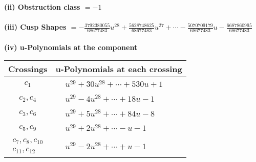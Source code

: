 \documentclass[1p]{elsarticle_modified}
\theoremstyle{definition}
\begin{document}
\flushleft \textbf{(ii) Obstruction class $= -1$}\\~\\
\flushleft \textbf{(iii) Cusp Shapes $= -\frac{3792380055}{68677483} u^{28}+\frac{5628748625}{68677483} u^{27}+\cdots-\frac{5070709179}{68677483} u-\frac{6687860995}{68677483}$}\\~\\
\newpage\renewcommand{\arraystretch}{1}
\flushleft \textbf{(iv) u-Polynomials at the component}\newline \\
\begin{tabular}{m{50pt}|m{274pt}}
Crossings & \hspace{64pt}u-Polynomials at each crossing \\
\hline $$\begin{aligned}c_{1}\end{aligned}$$&$\begin{aligned}
&u^{29}+30 u^{28}+\cdots+530 u+1
\end{aligned}$\\
\hline $$\begin{aligned}c_{2},c_{4}\end{aligned}$$&$\begin{aligned}
&u^{29}-4 u^{28}+\cdots+18 u-1
\end{aligned}$\\
\hline $$\begin{aligned}c_{3},c_{6}\end{aligned}$$&$\begin{aligned}
&u^{29}+5 u^{28}+\cdots+84 u-8
\end{aligned}$\\
\hline $$\begin{aligned}c_{5},c_{9}\end{aligned}$$&$\begin{aligned}
&u^{29}+2 u^{28}+\cdots- u-1
\end{aligned}$\\
\hline $$\begin{aligned}c_{7},c_{8},c_{10}\\c_{11},c_{12}\end{aligned}$$&$\begin{aligned}
&u^{29}-2 u^{28}+\cdots+u-1
\end{aligned}$\\
\hline
\end{tabular}\\~\\
\newpage\renewcommand{\arraystretch}{1}
\end{document}
